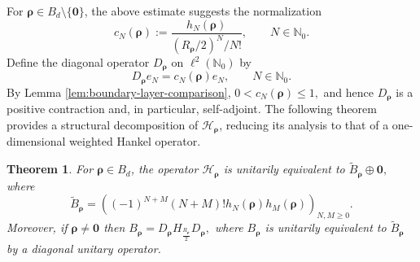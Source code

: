 \documentclass[12pt, reqno]{amsart}
\numberwithin{equation}{section}
\newtheorem{theorem}{Theorem}[section]
\begin{document}
For $\boldsymbol{\rho}\in B_d\setminus\{\mathbf0\}$, the above
estimate suggests the normalization
\[
c_N(\boldsymbol{\rho})
:=
\frac{h_N(\boldsymbol{\rho})}
{(R_{\boldsymbol{\rho}}/2)^N/N!},
\qquad N\in\mathbb N_0.
\]
Define the diagonal operator $D_{\boldsymbol{\rho}}$ on
$\ell^2(\mathbb N_0)$ by
\[
D_{\boldsymbol{\rho}}e_N
=
c_N(\boldsymbol{\rho})e_N,
\qquad N\in\mathbb N_0.
\]
By Lemma \ref{lem:boundary-layer-comparison}, $0<c_N(\boldsymbol{\rho})\le1,$
and hence $D_{\boldsymbol{\rho}}$ is a positive contraction and,
in particular, self-adjoint.
The following theorem provides a structural decomposition of $\mathcal{H}_{\boldsymbol{\rho}}$, reducing its analysis to that of a one-dimensional weighted Hankel operator.
\begin{theorem}
\label{thm:boundary-Hankel-reduction}
For $\boldsymbol{\rho}\in B_d$, the operator  \(\mathcal{H}_{\boldsymbol{\rho}}\) is unitarily equivalent to $\widetilde{B}_{\boldsymbol{\rho}}\oplus \mathbf{0},$ where
\[
\widetilde{B}_{\boldsymbol{\rho}}
=
\left(
(-1)^{N+M}(N+M)!h_N(\boldsymbol{\rho})h_M(\boldsymbol{\rho})
\right)_{N,M\geq 0}.
\]
Moreover, if $\boldsymbol{\rho}\neq \mathbf{0}$ then
$B_{\boldsymbol{\rho}} =
D_{\boldsymbol{\rho}}H_{\frac{R_{\boldsymbol{\rho}}}{2}}D_{\boldsymbol{\rho}},$
where $B_{\boldsymbol\rho}$ is unitarily equivalent to  $\widetilde B_{\boldsymbol\rho}$ by a diagonal unitary operator.

\end{theorem}
\end{document}
